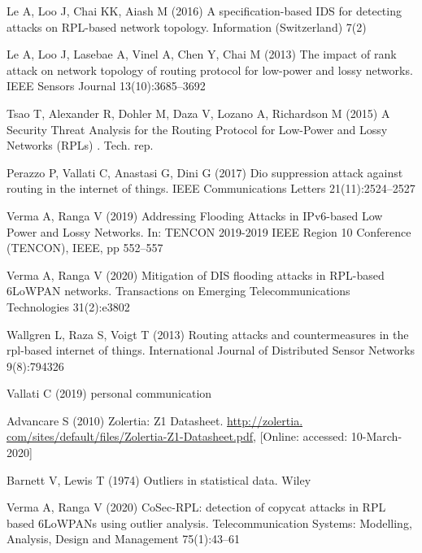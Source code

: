 \documentclass[]{svjour3}                     %
\begin{document}
\begin{thebibliography}{57}
	Le A, Loo J, Chai KK, Aiash M (2016) {A specification-based IDS for detecting
		attacks on RPL-based network topology}. Information (Switzerland) 7(2)
	
	Le A, Loo J, Lasebae A, Vinel A, Chen Y, Chai M (2013) The impact of rank
	attack on network topology of routing protocol for low-power and lossy
	networks. IEEE Sensors Journal 13(10):3685--3692
	
	Tsao T, Alexander R, Dohler M, Daza V, Lozano A, Richardson M (2015) {A
		Security Threat Analysis for the Routing Protocol for Low-Power and Lossy
		Networks (RPLs) }. Tech. rep.
	
	Perazzo P, Vallati C, Anastasi G, Dini G (2017) Dio suppression attack against
	routing in the internet of things. IEEE Communications Letters
	21(11):2524--2527
	
	Verma A, Ranga V (2019) {Addressing Flooding Attacks in IPv6-based Low Power
		and Lossy Networks}. In: TENCON 2019-2019 IEEE Region 10 Conference (TENCON),
	IEEE, pp 552--557
	
	Verma A, Ranga V (2020) {Mitigation of DIS flooding attacks in RPL-based
		6LoWPAN networks}. Transactions on Emerging Telecommunications Technologies
	31(2):e3802
	
	Wallgren L, Raza S, Voigt T (2013) Routing attacks and countermeasures in the
	rpl-based internet of things. International Journal of Distributed Sensor
	Networks 9(8):794326
	
	Vallati C (2019) personal communication
	
	Advancare S (2010) {Zolertia: Z1 Datasheet}. \url{http://zolertia.
		com/sites/default/files/Zolertia-Z1-Datasheet.pdf}, [Online: accessed:
	10-March-2020]
	
	Barnett V, Lewis T (1974) Outliers in statistical data. Wiley
	
	Verma A, Ranga V (2020) {CoSec-RPL: detection of copycat attacks in RPL based
		6LoWPANs using outlier analysis}. Telecommunication Systems: Modelling,
	Analysis, Design and Management 75(1):43--61
	

\end{thebibliography}
\end{document}
